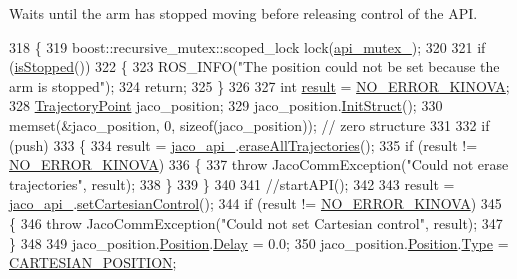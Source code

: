 Waits until the arm has stopped moving before releasing control of the A\+PI. 
\begin{DoxyCode}
318 \{
319     boost::recursive\_mutex::scoped\_lock lock(\hyperlink{classjaco_1_1JacoComm_ac6ef2a6b3c51877fc4237d834c35908a}{api\_mutex\_});
320 
321     \textcolor{keywordflow}{if} (\hyperlink{classjaco_1_1JacoComm_a872b8033cda5a9fe4ccdca2e89aa03d1}{isStopped}())
322     \{
323         ROS\_INFO(\textcolor{stringliteral}{"The position could not be set because the arm is stopped"});
324         \textcolor{keywordflow}{return};
325     \}
326 
327     \textcolor{keywordtype}{int} \hyperlink{Kinova_8API_8CommLayerUbuntu_8h_a900dac90961bada00f57c207562a6a9a}{result} = \hyperlink{Kinova_8API_8CommLayerUbuntu_8h_a510f2320a2a31d2d225adc0da7bef595}{NO\_ERROR\_KINOVA};
328     \hyperlink{structTrajectoryPoint}{TrajectoryPoint} jaco\_position;
329     jaco\_position.\hyperlink{structTrajectoryPoint_a1a9f12ad88f5011c6a4644792fa67f99}{InitStruct}();
330     memset(&jaco\_position, 0, \textcolor{keyword}{sizeof}(jaco\_position));  \textcolor{comment}{// zero structure}
331 
332     \textcolor{keywordflow}{if} (push)
333     \{
334         result = \hyperlink{classjaco_1_1JacoComm_a8d1510c941f28a4e8f921691d4fd2248}{jaco\_api\_}.\hyperlink{classjaco_1_1JacoAPI_a97db09d91923328b1780bb50a0e2548d}{eraseAllTrajectories}();
335         \textcolor{keywordflow}{if} (result != \hyperlink{Kinova_8API_8CommLayerUbuntu_8h_a510f2320a2a31d2d225adc0da7bef595}{NO\_ERROR\_KINOVA})
336         \{
337             \textcolor{keywordflow}{throw} JacoCommException(\textcolor{stringliteral}{"Could not erase trajectories"}, result);
338         \}
339     \}
340 
341     \textcolor{comment}{//startAPI();}
342 
343     result = \hyperlink{classjaco_1_1JacoComm_a8d1510c941f28a4e8f921691d4fd2248}{jaco\_api\_}.\hyperlink{classjaco_1_1JacoAPI_a24b6c14f08d97bea2a5562c8c2f10877}{setCartesianControl}();
344     \textcolor{keywordflow}{if} (result != \hyperlink{Kinova_8API_8CommLayerUbuntu_8h_a510f2320a2a31d2d225adc0da7bef595}{NO\_ERROR\_KINOVA})
345     \{
346         \textcolor{keywordflow}{throw} JacoCommException(\textcolor{stringliteral}{"Could not set Cartesian control"}, result);
347     \}
348 
349     jaco\_position.\hyperlink{structTrajectoryPoint_aa24430dc273e9d7968a6c44e3bcee259}{Position}.\hyperlink{structUserPosition_aa18896c1238a50c8ad81c66dfd76ac5e}{Delay} = 0.0;
350     jaco\_position.\hyperlink{structTrajectoryPoint_aa24430dc273e9d7968a6c44e3bcee259}{Position}.\hyperlink{structUserPosition_a93c748d4ee51239fcbcd487d88e52ffa}{Type} = \hyperlink{KinovaTypes_8h_a0a1c22d235ef1b13cfcd1419d10babc9aa98b51871329200ef579781620a475ad}{CARTESIAN\_POSITION};

\end{DoxyCode}
